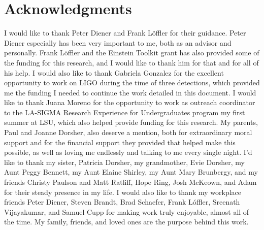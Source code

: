 \documentclass[12pt,letterpaper]{lsuetd}
\begin{document}

\chapter*{Acknowledgments}
\doublespacing
\vspace{0.55ex}
I would like to thank Peter Diener and Frank L\"{o}ffler for their guidance. Peter Diener especially has been very important to me, both as an advisor and personally. Frank L\"{o}ffler and the Einstein Toolkit grant has also provided some of the funding for this research, and I would like to thank him for that and for all of his help. I would also like to thank Gabriela Gonzalez for the excellent opportunity to work on LIGO during the time of three detections, which provided me the funding I needed to continue the work detailed in this document. I would like to thank Juana Moreno for the opportunity to work as outreach coordinator to the LA-SIGMA Research Experience for Undergraduates program my first summer at LSU, which also helped provide funding for this research. My parents, Paul and Joanne Dorsher, also deserve a mention, both for extraordinary moral support and for the financial support they provided that helped make this possible, as well as loving me endlessly and talking to me every single night. I'd like to thank my sister, Patricia Dorsher, my grandmother, Evie Dorsher, my Aunt Peggy Bennett, my Aunt Elaine Shirley, my Aunt Mary Brunbergy, and my friends Christy Paulson and Matt Ratliff, Hope Ring, Josh McKeown, and Adam for their steady presence in my life. I would also like to thank my workplace friends Peter Diener, Steven Brandt, Brad Schaefer, Frank L\'{o}ffler, Sreenath Vijayakumar, and Samuel Cupp for making work truly enjoyable, almost all of the time. My family, friends, and loved ones are the purpose behind this work. 

\pagebreak
\end{document}
